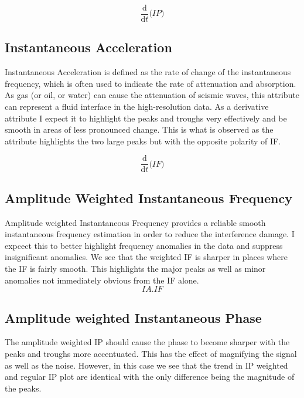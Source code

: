 \begin{equation}
     \frac{\mathrm d}{\mathrm d t} \big( IP \big)
\end{equation}

\subsection{Instantaneous Acceleration}

Instantaneous Acceleration is defined as the rate of change of the instantaneous frequency, which is often used to indicate the rate of attenuation and absorption. As gas (or oil, or water) can cause the attenuation of seismic waves, this attribute can represent a fluid interface in the high-resolution data. As a derivative attribute I expect it to highlight the peaks and troughs very effectively and be smooth in areas of less pronounced change. This is what is observed as the attribute highlights the two large peaks but with the opposite polarity of IF. 

\begin{equation}
      \frac{\mathrm d}{\mathrm d t} \big( IF \big)
\end{equation}

\subsection{Amplitude Weighted Instantaneous Frequency}

Amplitude weighted Instantaneous Frequency provides a reliable smooth instantaneous frequency estimation in order to reduce the interference damage. I expcect this to better highlight frequency anomalies in the data and suppress insignificant anomalies. We see that the weighted IF is sharper in places where the IF is fairly smooth. This highlights the major peaks as well as minor anomalies not immediately obvious from the IF alone.\\

\begin{equation}
      IA . IF
\end{equation}

\subsection{Amplitude weighted Instantaneous Phase}

The amplitude weighted IP should cause the phase to become sharper with the peaks and troughs more accentuated. This has the effect of magnifying the signal as well as the noise. However, in this case we see that the trend in IP weighted and regular IP plot are identical with the only difference being the magnitude of the peaks. \\

